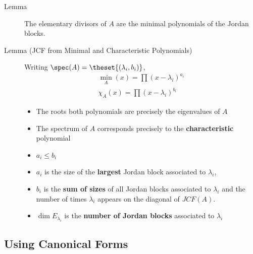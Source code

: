 \begin{description}
\item[Lemma]
The elementary divisors of \(A\) are the minimal polynomials of the
Jordan blocks.
\item[Lemma (JCF from Minimal and Characteristic Polynomials)]
Writing \(\spec(A) = \theset{(\lambda_i, b_i)}\), \begin{align*}
\min_A(x) = \prod (x- \lambda_i)^{a_i} \\
\chi_A(x) = \prod (x- \lambda_i)^{b_i}
\end{align*}

\begin{itemize}
\item
  The roots both polynomials are precisely the eigenvalues of \(A\)
\item
  The spectrum of \(A\) corresponds precisely to the
  \textbf{characteristic} polynomial
\item
  \(a_i \leq b_i\)
\item
  \(a_i\) is the size of the \textbf{largest} Jordan block associated to
  \(\lambda_i\),
\item
  \(b_i\) is the \textbf{sum of sizes} of all Jordan blocks associated
  to \(\lambda_i\) and the number of times \(\lambda_i\) appears on the
  diagonal of \(JCF(A)\).
\item
  \(\dim E_{\lambda_i}\) is the \textbf{number of Jordan blocks}
  associated to \(\lambda_i\)
\end{itemize}
\end{description}

\hypertarget{using-canonical-forms}{%
\subsection{Using Canonical Forms}\label{using-canonical-forms}}

